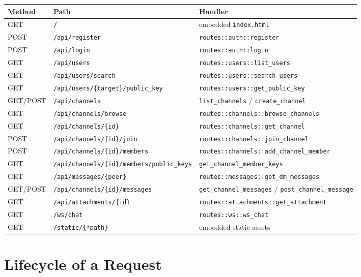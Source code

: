 \begin{center}
\begin{longtable}{@{}llp{}@{}}
\toprule
\textbf{Method} & \textbf{Path} & \textbf{Handler} \\
\midrule
\endhead
GET & \verb|/| & embedded \verb|index.html| \\
POST & \verb|/api/register| & \verb|routes::auth::register| \\
POST & \verb|/api/login| & \verb|routes::auth::login| \\
GET & \verb|/api/users| & \verb|routes::users::list_users| \\
GET & \verb|/api/users/search| & \verb|routes::users::search_users| \\
GET & \verb|/api/users/{target}/public_key| & \verb|routes::users::get_public_key| \\
GET/POST & \verb|/api/channels| & \verb|list_channels| / \verb|create_channel| \\
GET & \verb|/api/channels/browse| & \verb|routes::channels::browse_channels| \\
GET & \verb|/api/channels/{id}| & \verb|routes::channels::get_channel| \\
POST & \verb|/api/channels/{id}/join| & \verb|routes::channels::join_channel| \\
POST & \verb|/api/channels/{id}/members| & \verb|routes::channels::add_channel_member| \\
GET & \verb|/api/channels/{id}/members/public_keys| & \verb|get_channel_member_keys| \\
GET & \verb|/api/messages/{peer}| & \verb|routes::messages::get_dm_messages| \\
GET/POST & \verb|/api/channels/{id}/messages| & \verb|get_channel_messages| / \verb|post_channel_message| \\
GET & \verb|/api/attachments/{id}| & \verb|routes::attachments::get_attachment| \\
GET & \verb|/ws/chat| & \verb|routes::ws::ws_chat| \\
GET & \verb|/static/{*path}| & embedded static assets \\
\bottomrule
\end{longtable}
\end{center}

\section{Lifecycle of a Request}

